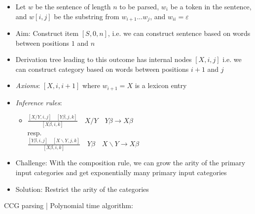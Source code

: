 \begin{itemize}
    \item Let $w$ be the sentence of length $n$ to be parsed, $w_i$ be a token in the sentence, and $w[i, j]$ be the substring from $w_{i+1} \dots w_j$, and $w_{ii} = \varepsilon$
    \item Aim: Construct item $[S, 0, n]$, i.e. we can construct sentence based on words between positions $1$ and $n$
    \item Derivation tree leading to this outcome has internal nodes $[X, i, j]$ i.e. we can construct category based on words between positions $i+1$ and $j$
    \item \emph{Axioms}: $[X, i, i+1]$ where $w_{i+1} = X$ is a lexicon entry
    \item \emph{Inference rules}:
    \begin{itemize}
        \item 
        $
        \frac{[X / Y, i, j] \quad [Y \beta, j, k]}{[X \beta, i, k]} \quad X / Y \quad Y \beta \to X \beta
        $\\
        resp.\\
        $
        \frac{[Y \beta, i, j] \quad [X \backslash Y, j, k]}{[X \beta, i, k]} \quad Y \beta \quad X \backslash Y \to X \beta
        $
    \end{itemize}
    \item Challenge: With the composition rule, we can grow the arity of the primary input categories and get exponentially many primary input categories
    \item Solution: Restrict the arity of the categories
\end{itemize}
CCG parsing | Polynomial time algorithm:
